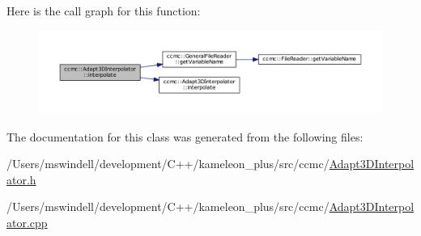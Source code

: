 Here is the call graph for this function\-:
\nopagebreak
\begin{figure}[H]
\begin{center}
\leavevmode
\includegraphics[width=350pt]{classccmc_1_1_adapt3_d_interpolator_a62f9740d20678b993f2871c6505f7df3_cgraph}
\end{center}
\end{figure}




The documentation for this class was generated from the following files\-:\begin{DoxyCompactItemize}
\item 
/\-Users/mswindell/development/\-C++/kameleon\-\_\-plus/src/ccmc/\hyperlink{_adapt3_d_interpolator_8h}{Adapt3\-D\-Interpolator.\-h}\item 
/\-Users/mswindell/development/\-C++/kameleon\-\_\-plus/src/ccmc/\hyperlink{_adapt3_d_interpolator_8cpp}{Adapt3\-D\-Interpolator.\-cpp}\end{DoxyCompactItemize}
